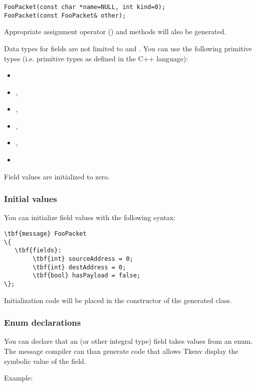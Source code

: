 \begin{verbatim}
FooPacket(const char *name=NULL, int kind=0);
FooPacket(const FooPacket& other);
\end{verbatim}

Appropriate assignment operator () and  methods will
also be generated.

Data types for fields are not limited to  and . You can use the
following primitive types (i.e. primitive types as defined in the C++ language):

\begin{itemize}
   \item {}
   \item {}, 
   \item {}, 
   \item {}, 
   \item {}, 
   \item {}
\end{itemize}

Field values are initialized to zero.


\subsubsection{Initial values}

You can initialize field values with the following syntax:

\begin{Verbatim}[commandchars=\\\{\}]
\tbf{message} FooPacket
\{
   \tbf{fields}:
        \tbf{int} sourceAddress = 0;
        \tbf{int} destAddress = 0;
        \tbf{bool} hasPayload = false;
\};
\end{Verbatim}

Initialization code will be placed in the constructor of the generated class.


\subsubsection{Enum declarations}

You can declare that an  (or other integral type) field
takes values from an enum. The message compiler can than generate code
that allows Tkenv display the symbolic value of the field.

Example:

